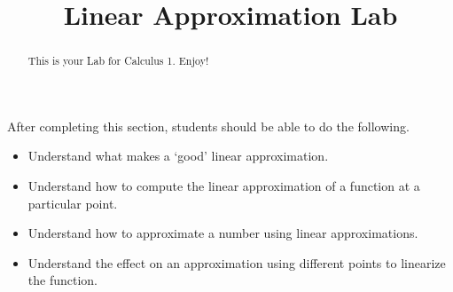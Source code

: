 \documentclass{ximera}
\title{Linear Approximation Lab}
\begin{document}
\begin{abstract}
This is your Lab for Calculus 1. Enjoy!
\end{abstract}

\maketitle

\begin{sectionOutcomes}

After completing this section, students should be able to do the following.

\begin{itemize}
    \item Understand what makes a `good' linear approximation.
	\item Understand how to compute the linear approximation of a function at a particular point.
    \item Understand how to approximate a number using linear approximations.
    \item Understand the effect on an approximation using different points to linearize the function.
\end{itemize}

\end{sectionOutcomes}
\end{document}
